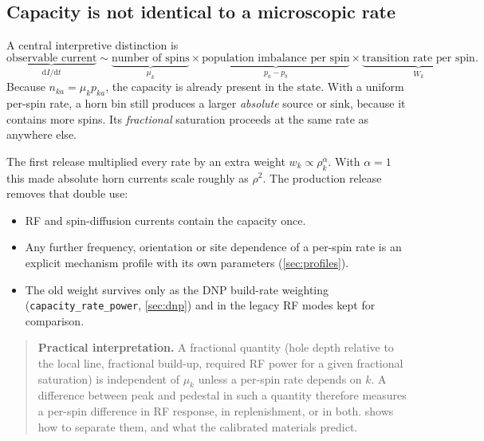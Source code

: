 \documentclass[11pt]{article}
\newcommand{\dd}{\mathrm{d}}
\newcommand{\code}[1]{\texttt{#1}}
\begin{document}
\subsection{Capacity is not identical to a microscopic rate}
\label{sec:capacity-vs-rate}

A central interpretive distinction is
\begin{equation}
  \underbrace{\text{observable current}}_{\dd I/\dd t}
  \sim
  \underbrace{\text{number of spins}}_{\mu_k}
  \times
  \underbrace{\text{population imbalance per spin}}_{p_a-p_b}
  \times
  \underbrace{\text{transition rate per spin}}_{W_k}.
  \label{eq:capacityratefactorization}
\end{equation}
Because \(n_{ka}=\mu_k p_{ka}\), the capacity is already present in the state. With a uniform
per-spin rate, a horn bin still produces a larger \emph{absolute} source or sink, because it
contains more spins. Its \emph{fractional} saturation proceeds at the same rate as anywhere else.

The first release multiplied every rate by an extra weight \(w_k\propto\rho_k^\alpha\). With
\(\alpha=1\) this made absolute horn currents scale roughly as \(\rho^2\). The production
release removes that double use:
\begin{itemize}
  \item RF and spin-diffusion currents contain the capacity once.
  \item Any further frequency, orientation or site dependence of a per-spin rate is an explicit
  mechanism profile with its own parameters (\cref{sec:profiles}).
  \item The old weight survives only as the DNP build-rate weighting (\code{capacity\_rate\_power},
  \cref{sec:dnp}) and in the legacy RF modes kept for comparison.
\end{itemize}

\begin{quote}
\textbf{Practical interpretation.}  A fractional quantity (hole depth relative to the local line,
fractional build-up, required RF power for a given fractional saturation) is independent of
\(\mu_k\) unless a per-spin rate depends on \(k\).  A difference between peak and pedestal in
such a quantity therefore measures a per-spin difference in RF response, in replenishment, or
in both.   shows how to separate them, and what the calibrated
materials predict.
\end{quote}

\end{document}
